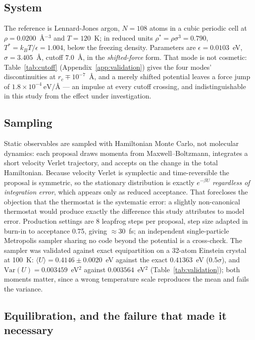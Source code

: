 \documentclass[aip,jcp,reprint,amsmath,amssymb,floatfix]{revtex4-2}
\newcommand{\avg}[1]{\ensuremath{\langle #1 \rangle}}
\newcommand{\Var}{\ensuremath{\mathrm{Var}}}
\newcommand{\eVA}{\ensuremath{\mathrm{eV}/\text{\AA}}}
\begin{document}
\subsection{System}

The reference is Lennard-Jones argon\cite{Jones1924}, $N = 108$ atoms in
a cubic periodic cell at $\rho = 0.0200$~\AA$^{-3}$ and $T = 120$~K; in reduced
units $\rho^* = \rho\sigma^3 = 0.790$, $T^* = k_BT/\epsilon = 1.004$, below the
freezing density\cite{Verlet1967,
HansenMcDonald2013}. Parameters are $\epsilon = 0.0103$~eV,
$\sigma = 3.405$~\AA, cutoff $7.0$~\AA, in the \emph{shifted-force} form. That
mode is not cosmetic: Table~\ref{tab:cutoff}
(Appendix~\ref{app:validation}) gives the four modes' discontinuities at
$r_c \mp 10^{-7}$~\AA, and a merely shifted potential leaves a force jump of
$1.8\times10^{-4}~\eVA$ --- an impulse at every cutoff crossing, and
indistinguishable in this study from the effect under investigation.

\subsection{Sampling}

Static observables are sampled with Hamiltonian Monte
Carlo\cite{Duane1987, Neal2011}, not molecular dynamics: each proposal draws
momenta from Maxwell--Boltzmann, integrates a short velocity
Verlet trajectory\cite{Swope1982}, and accepts on the change in the total
Hamiltonian. Because velocity Verlet is symplectic and time-reversible the
proposal is symmetric, so the stationary distribution is exactly $e^{-\beta U}$
\emph{regardless of integration error}, which appears only as reduced
acceptance. That forecloses the objection
that the thermostat is the systematic error: a slightly non-canonical thermostat
would produce exactly the difference this study attributes to model error.
Production settings are 8 leapfrog steps per proposal, step size adapted in
burn-in to acceptance 0.75, giving $\approx 30$~fs; an
independent single-particle Metropolis sampler\cite{Metropolis1953} sharing no
code beyond the potential is a cross-check. The sampler was validated against
exact equipartition on a 32-atom Einstein
crystal at 100~K: $\avg{U} = 0.4146 \pm 0.0020$~eV against the exact
$0.41363$~eV ($0.5\sigma$), and $\Var(U) = 0.003459$~eV$^2$ against
$0.003564$~eV$^2$ (Table~\ref{tab:validation}); both moments
matter, since a wrong temperature scale reproduces the mean and fails the
variance.

\subsection{Equilibration, and the failure that made it necessary}
\label{sec:equilibration}
\end{document}
